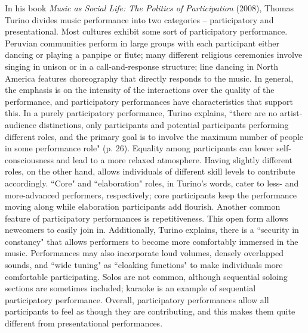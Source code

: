 In his book \textit{Music as Social Life: The Politics of Participation} (2008), Thomas Turino divides music performance into two categories -- participatory and presentational. Most cultures exhibit some sort of participatory performance. Peruvian communities perform in large groups with each participant either dancing or playing a panpipe or flute; many different religious ceremonies involve singing in unison or in a call-and-response structure; line dancing in North America features choreography that directly responds to the music. In general, the emphasis is on the intensity of the interactions over the quality of the performance, and participatory performances have characteristics that support this. In a purely participatory performance, Turino explains, ``there are no artist-audience distinctions, only participants and potential participants performing different roles, and the primary goal is to involve the maximum number of people in some performance role" (p. 26). Equality among participants can lower self-consciousness and lead to a more relaxed atmosphere. Having slightly different roles, on the other hand, allows individuals of different skill levels to contribute accordingly. ``Core" and ``elaboration" roles, in Turino's words, cater to less- and more-advanced performers, respectively; core participants keep the performance moving along while elaboration participants add flourish. Another common feature of participatory performances is repetitiveness. This open form allows newcomers to easily join in. Additionally, Turino explains, there is a ``security in constancy" that allows performers to become more comfortably immersed in the music. Performances may also incorporate loud volumes, densely overlapped sounds, and ``wide tuning" as ``cloaking functions" to make individuals more comfortable participating. Solos are not common, although sequential soloing sections are sometimes included; karaoke is an example of sequential participatory performance. Overall, participatory performances allow all participants to feel as though they are contributing, and this makes them quite different from presentational performances.
